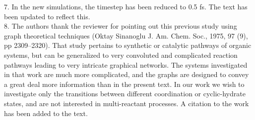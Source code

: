 \documentclass{article}
\begin{document}
7. In the new simulations, the timestep has been reduced to 0.5 fs. The text has been updated to reflect this.
\\

8. The authors thank the reviewer for pointing out this previous study using graph theoretical techniques (Oktay Sinanoglu J. Am. Chem. Soc., 1975, 97 (9), pp 2309–2320). That study pertains to synthetic or catalytic pathways of organic systems, but can be generalized to very convoluted and complicated reaction pathways leading to very intricate graphical networks. The systems investigated in that work are much more complicated, and the graphs are designed to convey a great deal more information than in the present text. In our work we wish to investigate only the transitions between different coordination or cyclic-hydrate states, and are not interested in multi-reactant processes. A citation to the work has been added to the text.
\\
\end{document}
